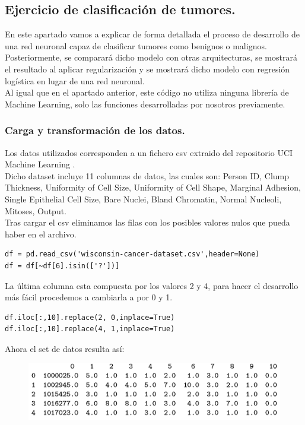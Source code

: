 \documentclass[a4paper,11pt]{article}
\begin{document}
\subsection{Ejercicio de clasificación de tumores.}
En este apartado vamos a explicar de forma detallada el proceso de desarrollo de una red neuronal capaz de clasificar tumores como benignos o malignos.\\

\noindent
Posteriormente, se comparará dicho modelo con otras arquitecturas, se mostrará el resultado al aplicar regularización y se mostrará dicho modelo con regresión logística en lugar de una red neuronal. \\

\noindent
Al igual que en el apartado anterior, este código no utiliza ninguna librería de Machine Learning, solo las funciones desarrolladas por nosotros previamente.
\subsubsection{Carga y transformación de los datos.}
Los datos utilizados corresponden a un fichero csv extraido del repositorio UCI Machine Learning \cite{uci} .\\

\noindent
Dicho dataset incluye 11 columnas de datos, las cuales son: Person ID, Clump Thickness, Uniformity of Cell Size, Uniformity of Cell Shape, Marginal Adhesion, Single Epithelial Cell Size, Bare Nuclei, Bland Chromatin, Normal Nucleoli, Mitoses, Output.\\

\noindent
Tras cargar el csv eliminamos las filas con los posibles valores nulos que pueda haber en el archivo.
\begin{lstlisting}
df = pd.read_csv('wisconsin-cancer-dataset.csv',header=None)
df = df[~df[6].isin(['?'])]
\end{lstlisting}
La última columna esta compuesta por los valores 2 y 4,  para hacer el desarrollo más fácil procedemos a cambiarla a por 0 y 1.
\begin{lstlisting}
df.iloc[:,10].replace(2, 0,inplace=True)
df.iloc[:,10].replace(4, 1,inplace=True)
\end{lstlisting}
Ahora el set de datos resulta así: 
\begin{figure}[H]
\centering
\includegraphics{Annotation 2020-03-23 185932.png}
\end{figure}
\end{document}
